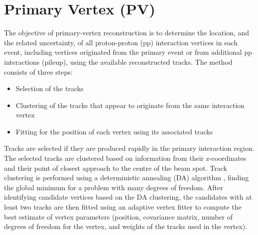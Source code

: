 \section{Primary Vertex (PV) }

The objective of primary-vertex reconstruction is to determine the location, and the related uncertainty, of all proton-proton (pp) interaction vertices in each event, including vertices originated from the primary event or from additional pp interactions (pileup), using the available reconstructed tracks. The method consists of three steps:
\begin{itemize}
\item
Selection of the tracks
\item
Clustering of the tracks that appear to originate from the same
interaction vertex
\item
Fitting for the position of each vertex using its associated tracks
\end{itemize}

Tracks are selected if they are produced rapidly in the primary interaction region. The selected tracks are clustered based on information from their z-coordinates and  their point of closest approach to the centre of the beam spot. Track clustering is performed using a deterministic annealing (DA) algorithm \cite{Rose}, finding the global minimum for a problem with many degrees of freedom.
After identifying candidate vertices based on the DA clustering, the candidates with at least two tracks are then fitted using an adaptive vertex fitter \cite{Fruhwirth:1027031} to compute the best estimate of vertex parameters (position, covariance matrix, number of degrees of freedom for the vertex, and weights of the tracks used in the vertex). 



